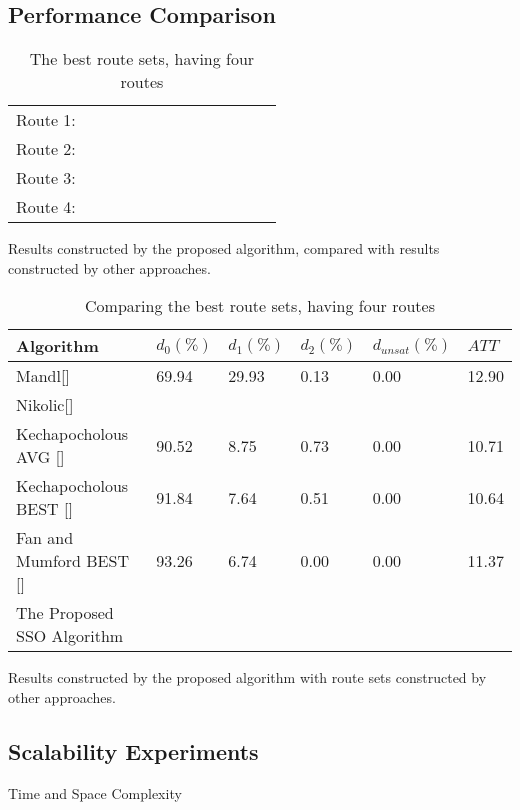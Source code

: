 \subsection{Performance Comparison}

\begin{table}[H]
	\centering
    \begin{tabular}{|l|l l l l l l l l|}
    \hline
    Route 1: & ~ & ~ & ~ & ~ & ~ & ~ & ~ & ~ \\
    Route 2: & ~ & ~ & ~ & ~ & ~ & ~ & ~ & ~ \\
    Route 3: & ~ & ~ & ~ & ~ & ~ & ~ & ~ & ~ \\
    Route 4: & ~ & ~ & ~ & ~ & ~ & ~ & ~ & ~ \\
	\hline
    \end{tabular}
    \caption {The best route sets, having four routes}
    Results constructed by the proposed algorithm, compared with results constructed by other approaches.
    \label{table:performanceComparison_bestRouteSet4}
	\end{table}

\begin{table}[H]
	\centering
    \begin{tabular}{|l||l|l|l|l|l|}
 	\hline
 	Algorithm & $d_0(\%)$ & $d_1(\%)$ & $d_2(\%)$ & $d_{unsat}(\%)$ & $ATT$ \\
 	\hline
    Mandl[] & 69.94 & 29.93 & 0.13 & 0.00 & 12.90 \\
    Nikolic[] & ~ & ~ & ~ & ~ & ~ \\
    Kechapocholous AVG [] & 90.52 & 8.75 & 0.73 & 0.00 & 10.71 \\
    Kechapocholous BEST [] & 91.84 & 7.64 & 0.51 & 0.00 & 10.64 \\
    Fan and Mumford BEST [] & 93.26 & 6.74 & 0.00 & 0.00 & 11.37 \\
	\hline
    \hline
    The Proposed SSO Algorithm & ~ & ~ & ~ & ~ & ~ \\
    \hline
    \end{tabular}
    \caption {Comparing the best route sets, having four routes}
    Results constructed by the proposed algorithm with route sets constructed by other approaches.
    \label{table:performanceComparison_4}
	\end{table}

\subsection{Scalability Experiments}
Time and Space Complexity